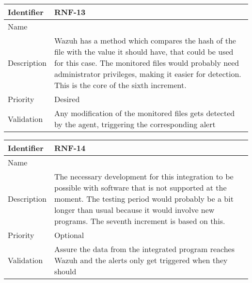 \begin{table}[H]
	\begin{tabularx}{\textwidth}{|l|X|}
		\hline
		\rowcolor{gray!30}
		Identifier & \textbf{RNF-13} \\ \hline
		Name & \RNFtrece \\ \hline
		Description & Wazuh has a method which compares the hash of the file with the value it should have, that could be used for this case. The monitored files would probably need administrator privileges, making it easier for detection. This is the core of the sixth increment.  \\ \hline
		Priority & Desired \\ \hline
		Validation & Any modification of the monitored files gets detected by the agent, triggering the corresponding alert \\ \hline
	\end{tabularx}
\end{table}
\begin{table}[H]
	\begin{tabularx}{\textwidth}{|l|X|}
		\hline
		\rowcolor{gray!30}
		Identifier & \textbf{RNF-14} \\ \hline
		Name & \RNFcatorce \\ \hline
		Description & The necessary development for this integration to be possible with software that is not supported at the moment. The testing period would probably be a bit longer than usual because it would involve new programs. The seventh increment is based on this. \\ \hline
		Priority & Optional \\ \hline
		Validation & Assure the data from the integrated program reaches Wazuh and the alerts only get triggered when they should \\ \hline
	\end{tabularx}
\end{table}
